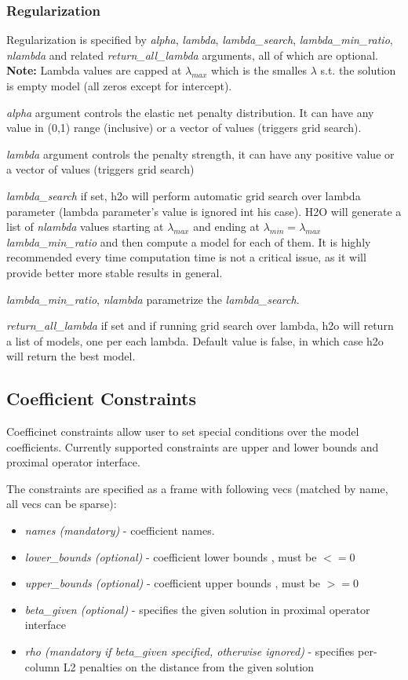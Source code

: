 \documentclass[11pt]{article}
\begin{document}
\subsubsection{Regularization}
Regularization is specified by \textit{alpha}, \textit{lambda}, \textit{lambda\_search}, \textit{lambda\_min\_ratio}, \textit{nlambda} and related \textit{return\_all\_lambda} arguments, all of which are optional. 
\textbf{Note:} Lambda values are capped at $\lambda_{max}$ which is the smalles $\lambda$ s.t. the solution is empty model (all zeros except for intercept).

\textit{alpha} argument controls the elastic net penalty distribution. It can have any value in (0,1) range (inclusive) or a vector of values (triggers grid search).

\textit{lambda} argument controls the penalty strength, it can have any positive value or a vector of values (triggers grid search)

\textit{lambda\_search} if set, h2o will perform automatic grid search over lambda parameter (lambda parameter's value is ignored int his case). H2O will generate a list of \textit{nlambda} values starting at $\lambda_{max}$ and ending at $\lambda_{min} = \lambda_{max}$ \textit{lambda\_min\_ratio} and then compute a model for each of them.
It is highly recommended every time computation time is not a critical issue, as it will provide better more stable results in general. 
 
\textit{lambda\_min\_ratio}, \textit{nlambda} parametrize the \textit{lambda\_search}.

\textit{return\_all\_lambda} if set and if running grid search over lambda, h2o will return a list of models, one per each lambda. Default value is false, in which case h2o will return the best model.  

\subsection{Coefficient Constraints}
Coefficinet constraints allow user to set special conditions over the model coefficients. Currently supported constraints are upper and lower bounds and proximal operator \cite{prox} interface. 

The constraints are specified as a frame with following vecs (matched by name, all vecs can be sparse):
\begin{itemize}
\item \textit{names (mandatory)}  - coefficient names. 
\item \textit{lower\_bounds (optional)} - coefficient lower bounds , must be $<= 0$
\item \textit{upper\_bounds (optional)} - coefficient upper bounds , must be $>= 0$
\item \textit{beta\_given (optional)} - specifies the given solution in proximal operator interface
\item \textit{rho (mandatory if beta\_given specified, otherwise ignored)} - specifies per-column L2 penalties on the distance from the given solution
\end{itemize}
 
\end{document}
